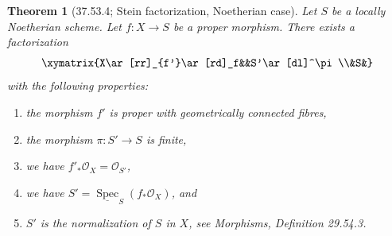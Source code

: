 \documentclass[UTF8,11pt]{ctexart}
\newtheorem*{theorem}{Theorem}
\theoremstyle{definition}
\DeclareMathOperator{\Spec}{Spec}
\begin{document}
\begin{theorem}[37.53.4; Stein factorization, Noetherian case]
Let $S$ be a locally Noetherian scheme. Let $f:X\to S$ be a proper morphism. There exists a factorization
\[\xymatrix{X\ar[rr]_{f'}\ar[rd]_f&&S'\ar[dl]^\pi\\&S&}\]
with the following properties:
\begin{enumerate}
\item the morphism $f'$ is proper with geometrically connected fibres,
\item the morphism $\pi:S'\to S$ is finite,
\item we have $f'_*\mathcal O_X=\mathcal O_{S'}$,
\item we have $S'=\underline{\Spec}_S(f_*\mathcal O_X)$, and
\item $S'$ is the normalization of $S$ in $X$, see Morphisms, Definition 29.54.3.
\end{enumerate}
\end{theorem}
\end{document}
